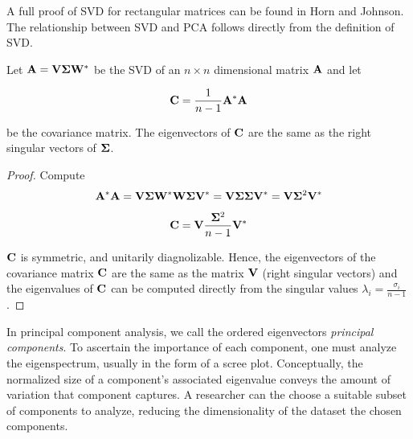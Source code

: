 A full proof of \gls{SVD} for rectangular matrices can be found in Horn and Johnson\cite{horn2013}. The relationship between
\gls{SVD} and \gls{PCA} follows directly from the definition of \gls{SVD}.

\begin{thm}
  Let $\mathbf{A} = \mathbf{V}\mathbf{\Sigma}\mathbf{W}^*$ be the \gls{SVD} of an $n \times n$ dimensional matrix $\mathbf{A}$ and let

  \[
    \mathbf{C} = \frac{1}{n - 1}\mathbf{A}^*\mathbf{A}
  \]

  be the covariance matrix.  The eigenvectors of $\mathbf{C}$ are the same as the \textnormal{right singular vectors} of
  $\mathbf{\Sigma}$.
\end{thm}

\begin{proof}
  Compute
  \[
    \mathbf{A}^*\mathbf{A} =
    \mathbf{V\Sigma}\mathbf{W}^*\mathbf{W\Sigma}\mathbf{V}^* =
    \mathbf{V\Sigma\Sigma}\mathbf{V}^* =
    \mathbf{V}\mathbf{\Sigma}^2\mathbf{V}^*
  \]

  \[
    \mathbf{C} = \mathbf{V}\frac{\mathbf{\Sigma}^2}{n - 1}\mathbf{V}^*
  \]

  $\mathbf{C}$ is symmetric, and unitarily diagnolizable.  Hence, the eigenvectors of the covariance matrix $\mathbf{C}$ are the same as the
  matrix $\mathbf{V}$ (right singular vectors) and the eigenvalues of $\mathbf{C}$ can be computed directly from the singular values
  $\lambda_i = \frac{\sigma_i}{n - 1}$.
\end{proof}

In principal component analysis, we call the ordered eigenvectors \textit{principal components}.  To ascertain the importance of each
component, one must analyze the \gls{eigenspectrum}, usually in the form of a \gls{scree plot}.  Conceptually, the normalized size of a component's
associated eigenvalue conveys the amount of variation that component captures.  A researcher can the choose a suitable subset of components to
analyze, reducing the dimensionality of the dataset the chosen components.

